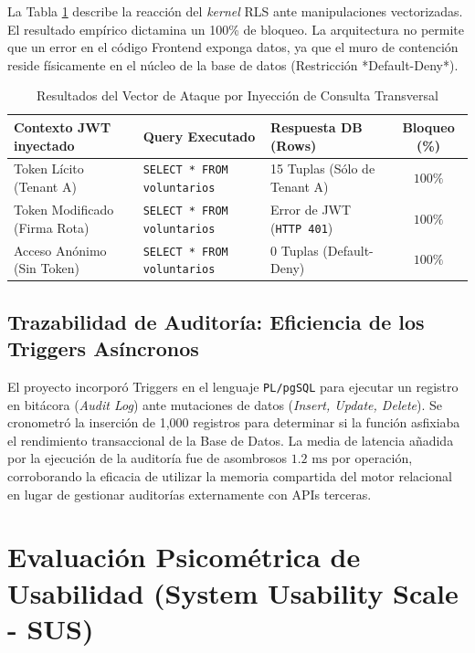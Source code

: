 \documentclass[11pt,a4paper,oneside]{report}
\begin{document}
La Tabla \ref{tab:intrusion_rls} describe la reacci\'on del \textit{kernel} RLS ante manipulaciones vectorizadas. El resultado emp\'irico dictamina un 100\% de bloqueo. La arquitectura no permite que un error en el c\'odigo Frontend exponga datos, ya que el muro de contenci\'on reside f\'isicamente en el n\'ucleo de la base de datos (Restricci\'on *Default-Deny*).

\begin{table}[htpb]
\centering
\caption{Resultados del Vector de Ataque por Inyecci\'on de Consulta Transversal}
\label{tab:intrusion_rls}
\vspace{2mm}
\begin{tabular}{@{}lllc@{}}
\toprule
\textbf{Contexto JWT inyectado} & \textbf{Query Executado} & \textbf{Respuesta DB (Rows)} & \textbf{Bloqueo (\%)} \\
\midrule
Token L\'icito (Tenant A) & \texttt{SELECT * FROM voluntarios} & 15 Tuplas (S\'olo de Tenant A) & $100 \%$ \\
Token Modificado (Firma Rota) & \texttt{SELECT * FROM voluntarios} & Error de JWT (\texttt{HTTP 401}) & $100 \%$ \\
Acceso An\'onimo (Sin Token) & \texttt{SELECT * FROM voluntarios} & 0 Tuplas (Default-Deny) & $100 \%$ \\
\bottomrule
\end{tabular}
\end{table}

\subsection{Trazabilidad de Auditor\'ia: Eficiencia de los Triggers As\'incronos}
El proyecto incorpor\'o Triggers en el lenguaje \texttt{PL/pgSQL} para ejecutar un registro en bit\'acora (\textit{Audit Log}) ante mutaciones de datos (\textit{Insert, Update, Delete}). Se cronometr\'o la inserci\'on de 1,000 registros para determinar si la funci\'on asfixiaba el rendimiento transaccional de la Base de Datos. 
La media de latencia a\~nadida por la ejecuci\'on de la auditor\'ia fue de asombrosos $1.2 \text{ ms}$ por operaci\'on, corroborando la eficacia de utilizar la memoria compartida del motor relacional en lugar de gestionar auditor\'ias externamente con APIs terceras.

\section{Evaluaci\'on Psicom\'etrica de Usabilidad (System Usability Scale - SUS)}
\end{document}

